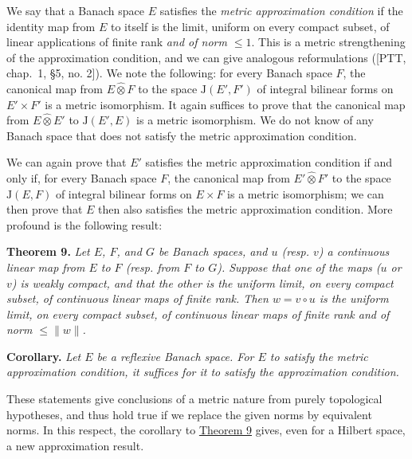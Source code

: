 \documentclass[british]{article}
\newenvironment{itenv}[1]
  {\phantomsection\par\smallskip\noindent\textbf{#1.}\itshape}
  {\par\smallskip}
\newcommand{\oldpage}[1]{\marginpar{\footnotesize$\Big\vert$ \textit{p.~#1}}}
\begin{document}
We say that a Banach space \(E\) satisfies the \emph{metric
approximation condition} if the identity map from \(E\) to itself is the
limit, uniform on every compact subset, of linear applications of finite
rank \emph{and of norm \(\leqslant 1\)}. This is a metric strengthening
of the approximation condition, and we can give analogous reformulations
({[}PTT, chap.~1, §5, no. 2{]}). \oldpage{97} We note the following: for
every Banach space \(F\), the canonical map from \(E\hat{\otimes}F\) to
the space \(\mathrm{J}(E',F')\) of integral bilinear forms on
\(E'\times F'\) is a metric isomorphism. It again suffices to prove that
the canonical map from \(E\hat{\otimes}E'\) to \(\mathrm{J}(E',E)\) is a
metric isomorphism. We do not know of any Banach space that does not
satisfy the metric approximation condition.

We can again prove that \(E'\) satisfies the metric approximation
condition if and only if, for every Banach space \(F\), the canonical
map from \(E'\hat{\otimes}F'\) to the space \(\mathrm{J}(E,F)\) of
integral bilinear forms on \(E\times F\) is a metric isomorphism; we can
then prove that \(E\) then also satisfies the metric approximation
condition. More profound is the following result:

\protect{}\label{section-1-theorem-9}
\begin{itenv}{Theorem 9}
Let \(E\), \(F\), and \(G\) be Banach spaces, and \(u\) (resp. \(v\)) a
continuous linear map from \(E\) to \(F\) (resp. from \(F\) to \(G\)).
Suppose that one of the maps (\(u\) or \(v\)) is weakly compact, and
that the other is the uniform limit, on every compact subset, of
continuous linear maps of finite rank. Then \(w=v\circ u\) is the
uniform limit, on every compact subset, of continuous linear maps of
finite rank \emph{and of norm \(\leqslant\|w\|\)}.

\end{itenv}

\begin{itenv}{Corollary}
Let \(E\) be a reflexive Banach space. For \(E\) to satisfy the metric
approximation condition, it suffices for it to satisfy the approximation
condition.

\end{itenv}

These statements give conclusions of a metric nature from purely
topological hypotheses, and thus hold true if we replace the given norms
by equivalent norms. In this respect, the corollary to
\hyperref[section-1-theorem-9]{Theorem 9} gives, even for a Hilbert
space, a new approximation result.
\end{document}
